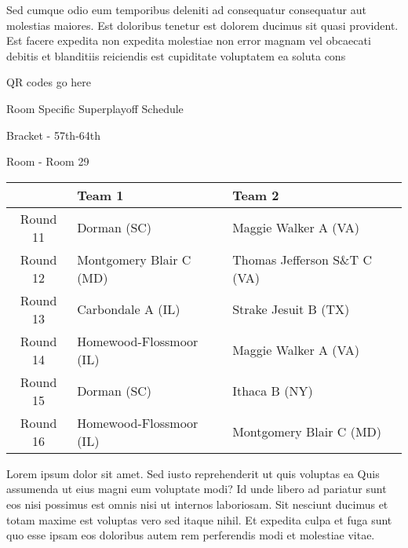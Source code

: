 \documentclass{article}%
\begin{document}
\newline%
    Sed cumque odio eum temporibus deleniti ad consequatur consequatur aut molestias maiores. Est doloribus tenetur est dolorem ducimus sit quasi provident. Est facere expedita non expedita molestiae non error magnam vel obcaecati debitis et blanditiis reiciendis est cupiditate voluptatem ea soluta cons%
\vspace*{140pt}%
\begin{center}%
\begin{Huge}%
QR codes go here%
\end{Huge}%
\end{center}%
\newpage%
\begin{center}%
\begin{Huge}%
Room Specific Superplayoff Schedule%
\end{Huge}%
\vspace*{8pt}%
\linebreak%
\begin{Large}%
Bracket {-} 57th{-}64th%
\end{Large}%
\vspace*{8pt}%
\linebreak%
\vspace*{8pt}%
\begin{Large}%
Room {-} Room 29%
\end{Large}%
\end{center}%
%
\begin{tabularx}{\textwidth}{|c|Y|Y|}%
\hline%
&Team 1&Team 2\\%
\hline%
Round 11&Dorman (SC)&Maggie Walker A (VA)\\%
Round 12&Montgomery Blair C (MD)&Thomas Jefferson S\&T C (VA)\\%
Round 13&Carbondale A (IL)&Strake Jesuit B (TX)\\%
Round 14&Homewood{-}Flossmoor (IL)&Maggie Walker A (VA)\\%
Round 15&Dorman (SC)&Ithaca B (NY)\\%
Round 16&Homewood{-}Flossmoor (IL)&Montgomery Blair C (MD)\\%
\hline%
\end{tabularx}%
\vspace*{8pt}%
\newline%
    Lorem ipsum dolor sit amet. Sed iusto reprehenderit ut quis voluptas ea Quis assumenda ut eius magni eum voluptate modi? Id unde libero ad pariatur sunt eos nisi possimus est omnis nisi ut internos laboriosam. Sit nesciunt ducimus et totam maxime est voluptas vero sed itaque nihil. Et expedita culpa et fuga sunt quo esse ipsam eos doloribus autem rem perferendis modi et molestiae vitae.\newline%
\end{document}
